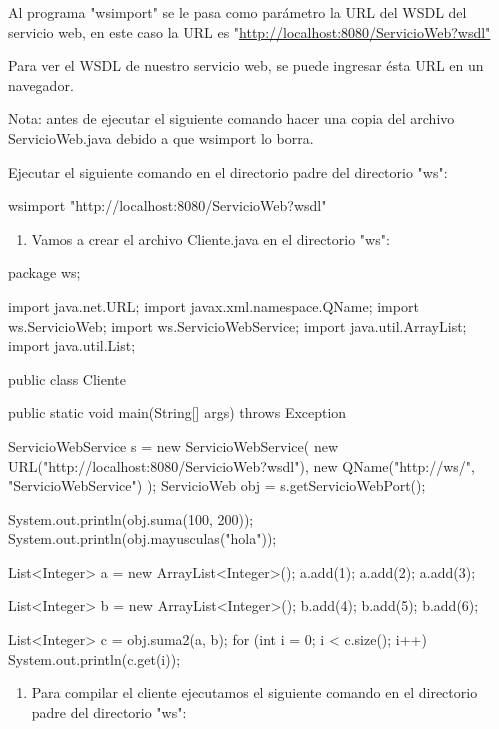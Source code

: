 Al programa "wsimport" se le pasa como parámetro la URL del WSDL del servicio web, en este caso la URL es "\url{http://localhost:8080/ServicioWeb?wsdl"}

\begin{SourceCode}
Para ver el WSDL de nuestro servicio web, se puede ingresar ésta URL en un navegador.
\end{SourceCode}

Nota: antes de ejecutar el siguiente comando hacer una copia del archivo ServicioWeb.java debido a que wsimport lo borra.

Ejecutar el siguiente comando en el directorio padre del directorio "ws":

\begin{SourceCode}
wsimport "http://localhost:8080/ServicioWeb?wsdl"
\end{SourceCode}

\begin{enumerate}
\item Vamos a crear el archivo Cliente.java en el directorio "ws":
\end{enumerate}

\begin{SourceCode}
package ws;

import java.net.URL;
import javax.xml.namespace.QName;
import ws.ServicioWeb;
import ws.ServicioWebService;
import java.util.ArrayList;
import java.util.List;

public class Cliente {
public static void main(String[] args) throws Exception {
ServicioWebService s = new ServicioWebService(
    new URL("http://localhost:8080/ServicioWeb?wsdl"),
    new QName("http://ws/", "ServicioWebService")
);
ServicioWeb obj = s.getServicioWebPort();

System.out.println(obj.suma(100, 200));
System.out.println(obj.mayusculas("hola"));

List<Integer> a = new ArrayList<Integer>();
a.add(1);
a.add(2);
a.add(3);

List<Integer> b = new ArrayList<Integer>();
b.add(4);
b.add(5);
b.add(6);

List<Integer> c = obj.suma2(a, b);
for (int i = 0; i < c.size(); i++)
    System.out.println(c.get(i));
}
}
\end{SourceCode}

\begin{enumerate}
\item Para compilar el cliente ejecutamos el siguiente comando en el directorio padre del directorio "ws":
\end{enumerate}

